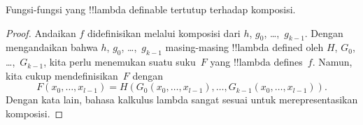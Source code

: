 \documentclass[../../../include/open-logic-section]{subfiles}
\begin{document}

\begin{lem}
Fungsi-fungsi yang !!{lambda definable} tertutup terhadap komposisi.
\end{lem}

\begin{proof}
Andaikan $f$ didefinisikan melalui komposisi dari $h$, $g_0$,
\dots,~$g_{k-1}$. Dengan mengandaikan bahwa $h$, $g_0$, \dots,~$g_{k-1}$
masing-masing !!{lambda defined} oleh $H$, $G_0$, \dots,~$G_{k-1}$, kita perlu
menemukan suatu suku~$F$ yang !!{lambda define}s~$f$. Namun, kita cukup
mendefinisikan~$F$ dengan
\[
F(x_0, \dots, x_{l-1}) = H(G_0(x_0, \dots, x_{l-1}),
\dots, G_{k-1}(x_0, \dots, x_{l-1})).
\]
Dengan kata lain, bahasa kalkulus lambda sangat sesuai untuk merepresentasikan
komposisi.
\end{proof}
\end{document}
